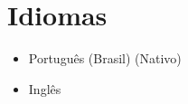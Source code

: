 \documentclass[a4paper,10pt]{article}
\begin{document}

\section{Idiomas}
    \begin{itemize}
        \item Português (Brasil) (Nativo)
        \item Inglês
    \end{itemize}
\end{document}
